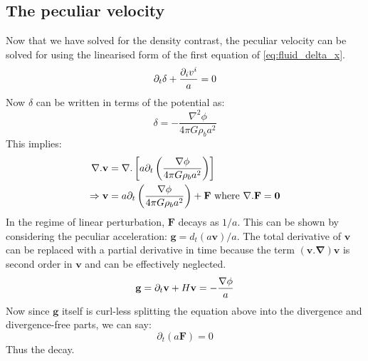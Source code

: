\documentclass[12pt,a4paper,twoside]{book}
\def\pa{{\partial}}
\begin{document}
		\subsection{The peculiar velocity}
			Now that we have solved for the density contrast, the peculiar velocity can be solved for using the linearised form of the first equation of \ref{eq:fluid_delta_x}.
			$$
				\pa_t\delta+\frac{\pa_iv^i}{a}=0\\
			$$
			Now $\delta$ can be written in terms of the potential as:
			$$
				\delta=-\frac{\nabla^2\phi}{4\pi G\rho_ba^2}
			$$
			This implies:
			$$
			\begin{aligned}
				\nabla.\mathbf{v}&=\nabla.\left[a\pa_t\left(\frac{\nabla\phi}{4\pi G\rho_ba^2}\right)\right]\\
				\Rightarrow\mathbf{v}&=a\pa_t\left(\frac{\nabla\phi}{4\pi G\rho_ba^2}\right)+\mathbf{F}\text{ where $\bf{\nabla.F}=0$}\\
			\end{aligned}
			$$
			In the regime of linear perturbation, $\mathbf{F}$ decays as $1/a$. This can be shown by considering the peculiar acceleration: $\mathbf{g}=d_t(a\mathbf{v})/a$. The total derivative of $\mathbf{v}$ can be replaced with a partial derivative in time because the term $\mathbf{(v.\nabla)v}$ is second order in $\mathbf{v}$ and can be effectively neglected.
			$$
			\mathbf{g}=\pa_t\mathbf{v}+H\mathbf{v}=-\frac{\nabla\phi}{a}\\
			$$
			Now since $\mathbf{g}$ itself is curl-less splitting the equation above into the divergence and divergence-free parts, we can say:
			$$
				\pa_t(a\mathbf{F})=0
			$$
			Thus the decay. 
\end{document}
